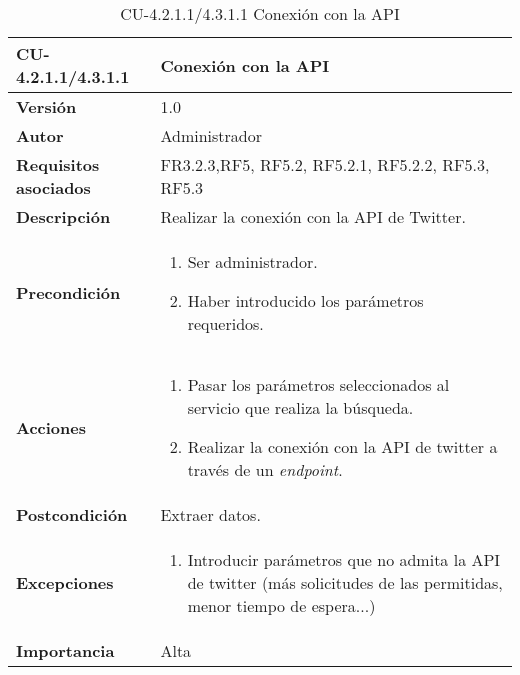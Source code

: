 \begin{table}[h!]
	\centering
	\begin{tabularx}{\linewidth}{ p{} p{} }
		\toprule
		\textbf{CU-4.2.1.1/4.3.1.1}    & \textbf{Conexión con la API}\\
		\toprule
		\textbf{Versión}              & 1.0    \\
		\textbf{Autor}                & Administrador \\
		\textbf{Requisitos asociados} & FR3.2.3,RF5, RF5.2, RF5.2.1, RF5.2.2, RF5.3, RF5.3\\
		\textbf{Descripción}          & Realizar la conexión con la API de Twitter.\\
        \textbf{Precondición}         &  
  	\begin{enumerate}
			\def\labelenumi{\arabic{enumi}.}
			\tightlist
			\item Ser administrador.
            \item Haber introducido los parámetros requeridos.
		\end{enumerate}\\
		\textbf{Acciones}             &
		\begin{enumerate}
			\def\labelenumi{\arabic{enumi}.}
			\tightlist
            \item Pasar los parámetros seleccionados al servicio que realiza la búsqueda.
            \item Realizar la conexión con la API de twitter a través de un \textit{endpoint}.
		  \end{enumerate}\\
            
		\textbf{Postcondición}     &   Extraer datos. \\
		\textbf{Excepciones}          & 
        \begin{enumerate}
            \def\labelenumi{\arabic{enumi}.}
            \tightlist
            \item Introducir parámetros que no admita la API de twitter (más solicitudes de las permitidas, menor tiempo de espera...)
		\end{enumerate}\\
		\textbf{Importancia}          & Alta\\
		\bottomrule
	\end{tabularx}
	\caption{CU-4.2.1.1/4.3.1.1 Conexión con la API}
\end{table}


